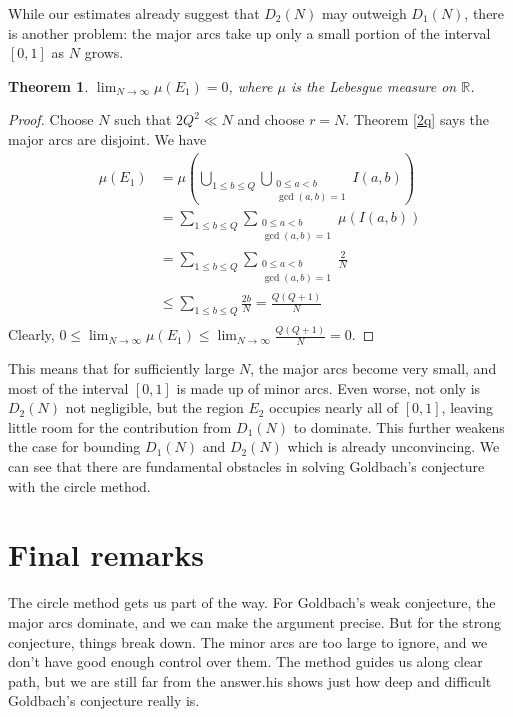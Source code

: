 \documentclass{article}
\newtheorem{theorem}{Theorem}
\begin{document}
While our estimates already suggest that $D_2(N)$ may outweigh $D_1(N)$, there is another problem: the major arcs take up only a small portion of the interval $[0,1]$ as $N$ grows.
\begin{theorem}\label{density}
    $\displaystyle \lim_{N\rightarrow \infty} \mu(E_1) = 0$, where $\mu$ is the Lebesgue measure on $\mathbb{R}$.
\end{theorem}
\begin{proof}
Choose $N$ such that $2Q^2 \ll N$ and choose $r = N$. Theorem \ref{2q} says the major arcs are disjoint. We have
\begin{align*}
        \mu(E_1) &= \mu\left(\bigcup_{1 \leq b \leq Q}\bigcup_{\substack{0 \leq a < b\\ \gcd(a,b) = 1}} I(a,b)\right)\\
        &= \sum_{1 \leq b \leq Q}\sum_{\substack{0 \leq a < b\\ \gcd(a,b) = 1}} \mu(I(a,b))\\
        &= \sum_{1 \leq b \leq Q}\sum_{\substack{0 \leq a < b\\ \gcd(a,b) = 1}} \frac{2}{N}\\
        &\leq \sum_{1 \leq b \leq Q} \frac{2b}{N} = \frac{Q(Q + 1)}{N}\\
    \end{align*}
    Clearly, $\displaystyle0 \leq \lim_{N\rightarrow \infty} \mu(E_1) \leq \lim_{N\rightarrow \infty} \frac{Q(Q + 1)}{N} = 0$.
\end{proof}
This means that for sufficiently large $N$, the major arcs become very small, and most of the interval $[0,1]$ is made up of minor arcs. Even worse, not only is $D_2(N)$ not negligible, but the region $E_2$ occupies nearly all of $[0,1]$, leaving little room for the contribution from $D_1(N)$ to dominate. This further weakens the case for bounding $D_1(N)$ and $D_2(N)$ which is already unconvincing. We can see that there are fundamental obstacles in solving Goldbach’s conjecture with the circle method.

\section{Final remarks}
The circle method gets us part of the way. For Goldbach's weak conjecture, the major arcs dominate, and we can make the argument precise. But for the strong conjecture, things break down. The minor arcs are too large to ignore, and we don't have good enough control over them. The method guides us along clear path, but we are still far from the answer.his shows just how deep and difficult Goldbach’s conjecture really is.
\end{document}
